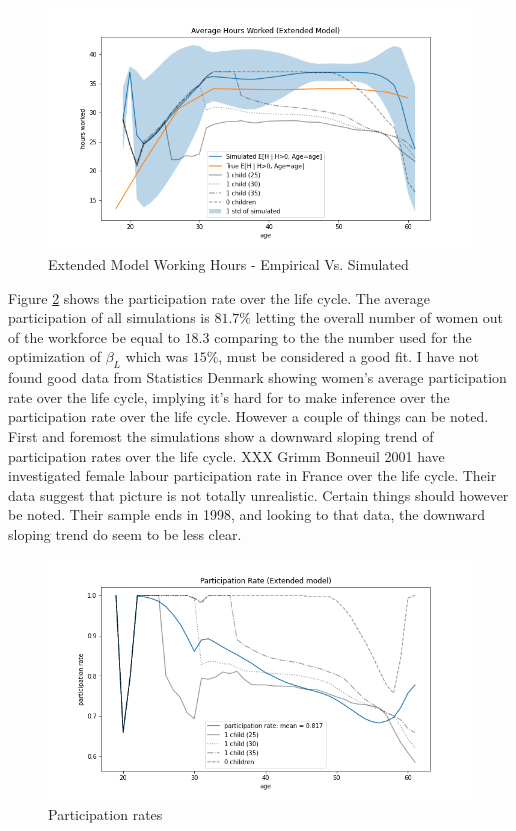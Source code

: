 \begin{figure}
    \centering
    \includegraphics[scale=0.4]{figures/extended_model_average_hours.png}
    \caption{Extended Model Working Hours - Empirical Vs. Simulated}
    \label{fig:ext_model_working_hours}
\end{figure}

Figure \ref{fig:ext_model_particpation_rates} shows the participation rate over the life cycle. The average participation of all simulations is $81.7 \%$ letting the overall number of women out of the workforce be equal to $18.3$ comparing to the the number used for the optimization of $\beta_L$ which was $15 \%$, must be considered a good fit. I have not found good data from Statistics Denmark showing women's average participation rate over the life cycle, implying it's hard for to make inference over the participation rate over the life cycle. However a couple of things can be noted. First and foremost the simulations show a downward sloping trend of participation rates over the life cycle. XXX Grimm Bonneuil 2001 have investigated female labour participation rate in France over the life cycle. Their data suggest that picture is not totally unrealistic. Certain things should however be noted. Their sample ends in 1998, and looking to that data, the downward sloping trend do seem to be less clear. 

\begin{figure}
    \centering
    \includegraphics[scale=0.4]{figures/extended_model_participation_rates.png}
    \caption{Participation rates}
    \label{fig:ext_model_particpation_rates}
\end{figure}


